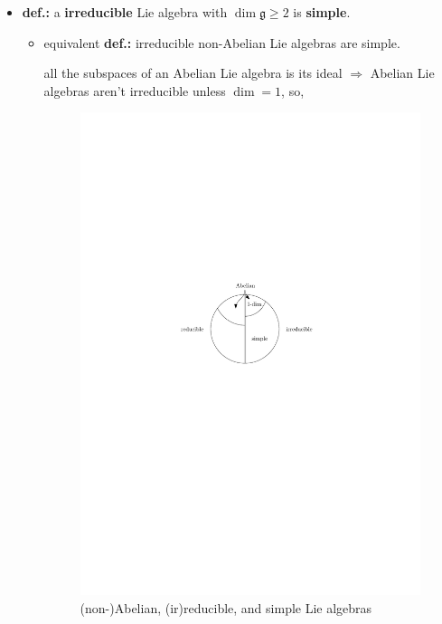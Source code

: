 \begin{itemize}
	\item \textbf{def.:} a \textbf{irreducible} Lie algebra with $\dim \mathfrak{g} \geq 2$ is \textbf{simple}.
	\begin{itemize}
		\item equivalent \textbf{def.:} irreducible non-Abelian Lie algebras are simple.
		
		\begin{tcolorbox}[title=proof:]
			all the subspaces of an Abelian Lie algebra is its ideal $\Longrightarrow$ Abelian Lie algebras aren't irreducible unless $\dim = 1$, so,
			
			\begin{figure}[H]
				\centering
				\includegraphics[scale=1]{figures/(non-)Abelian, (ir)reducible, and simple.pdf}
				\caption{(non-)Abelian, (ir)reducible, and simple Lie algebras}
			\end{figure}
		\end{tcolorbox}
	\end{itemize}
	

\end{itemize}
